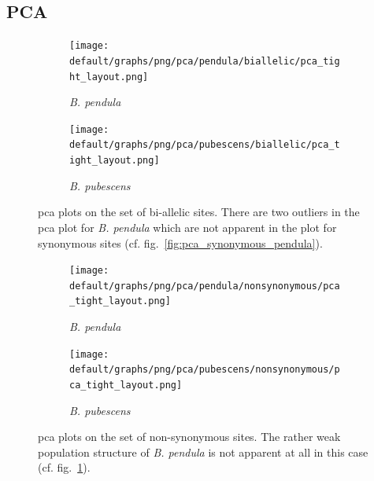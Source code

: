 \documentclass[hidelinks,11pt]{article}
\newcommand{\pendula}{\textit{B. pendula}}
\newcommand{\pubescens}{\textit{B. pubescens}}
\begin{document}
    \clearpage

    \subsection{PCA}
    \label{sec:appendix-pca}

    \begin{figure}[H]
        \centering
        \begin{subfigure}[b]{0.49\textwidth}
            \centering
            \texttt{[image: default/graphs/png/pca/pendula/biallelic/pca\_tight\_layout.png]}
            \caption{\pendula{}}
            \label{fig:pca_pendula}
        \end{subfigure}
        \hfill
        \begin{subfigure}[b]{0.501\textwidth}
            \centering
            \texttt{[image: default/graphs/png/pca/pubescens/biallelic/pca\_tight\_layout.png]}
            \caption{\pubescens{}}
            \label{fig:pca_pubescens}
        \end{subfigure}
        \caption{\acrshort{pca} plots on the set of bi-allelic sites. There are two outliers in the \acrshort{pca} plot for \pendula{} which are not apparent in the plot for synonymous sites (cf. fig.~\ref{fig:pca_synonymous_pendula}).}
        \label{fig:pca_pendula_pubescens_separate}
    \end{figure}

    \begin{figure}[H]
        \centering
        \begin{subfigure}[b]{0.493\textwidth}
            \centering
            \texttt{[image: default/graphs/png/pca/pendula/nonsynonymous/pca\_tight\_layout.png]}
            \caption{\pendula{}}
            \label{fig:pca_nonsynonymous_pendula}
        \end{subfigure}
        \hfill
        \begin{subfigure}[b]{0.49\textwidth}
            \centering
            \texttt{[image: default/graphs/png/pca/pubescens/nonsynonymous/pca\_tight\_layout.png]}
            \caption{\pubescens{}}
            \label{fig:pca_nonsynonymous_pubescens}
        \end{subfigure}
        \caption{\acrshort{pca} plots on the set of non-synonymous sites. The rather weak population structure of \pendula{} is not apparent at all in this case (cf. fig.~\ref{fig:pca_pendula}).}
        \label{fig:pca_pendula_pubescens_separate_nonsynonymous}
    \end{figure}
\end{document}
